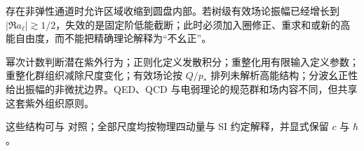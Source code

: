 存在非弹性通道时允许区域收缩到圆盘内部。若树级有效场论振幅已经增长到 \(|\Re a_\ell|\gtrsim1/2\)，失效的是固定阶低能截断；此时必须加入圈修正、重求和或新的高能自由度，而不能把精确理论解释为“不幺正”。

幂次计数判断潜在紫外行为；正则化定义发散积分；重整化用有限输入定义参数；重整化群组织减除尺度变化；有效场论按 \(Q/p_*\) 排列未解析高能结构；分波幺正性给出振幅的非微扰边界。QED、QCD 与电弱理论的规范群和场内容不同，但共享这套紫外组织原则。


这些结构可与 \cite{PeskinSchroeder1995,Schwartz2014QFT} 对照；全部尺度均按物理四动量与 SI 约定解释，并显式保留 \(c\) 与 \(\hbar\)。
